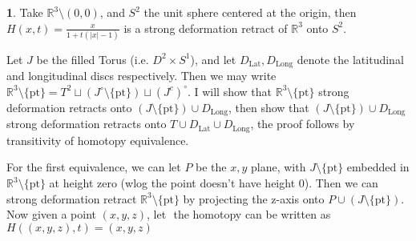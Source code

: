 \documentclass[10.5pt]{article}
\theoremstyle{definition}
\newtheorem{pb}{}
\newcommand{\set}[1]{\{#1\}}
\newcommand{\abs}[1]{\lvert#1\rvert}
\begin{document}
    \begin{pb}
        Take \(\mathbb{R}^3 \setminus (0,0)\), and \(S^2\) the unit sphere centered at the origin, then \(H(x,t) = \frac{x}{1+t(\abs{x}-1)}\) is a strong deformation retract of
        \(\mathbb{R}^3\) onto \(S^2\).

        Let \(J \) be the filled Torus (i.e. \(D^2 \times S^1\)), and let \(D_\text{Lat}, D_\text{Long}\) denote the latitudinal and longitudinal discs respectively. 
        Then we may write \(\mathbb{R}^3 \setminus \set{\text{pt}} = T^2 \sqcup (J^\circ \setminus \set{\text{pt}}) \sqcup \left(J^c\right)^\circ\).
        I will show that \(\mathbb{R}^3 \setminus \set{\text{pt}}\) strong deformation retracts onto \((J \setminus \set{\text{pt}}) \cup D_\text{Long}\), then show that
        \((J \setminus \set{\text{pt}}) \cup D_\text{Long}\) strong deformation retracts onto \(T \cup D_\text{Lat} \cup D_\text{Long}\), the proof follows by transitivity of homotopy equivalence.

        For the first equivalence, we can let \(P\) be the \(x,y\) plane, with \(J \setminus \set{\text{pt}}\) embedded in \(\mathbb{R}^3 \setminus \set{\text{pt}}\) at height zero 
        (wlog the point doesn't have height 0). Then we can strong deformation retract \(\mathbb{R}^3 \setminus \set{\text{pt}}\) by projecting the z-axis onto \(P \cup (J \setminus \set{\text{pt}})\). 
        Now given a point \((x,y,z)\), let \(\) the homotopy can be written as \(H((x,y,z),t) = (x,y,z)\)
    \end{pb}
\end{document}
